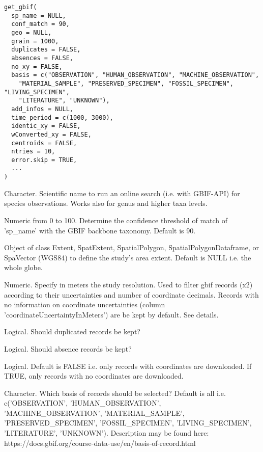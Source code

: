 \documentclass[a4paper]{book}
\begin{document}
%
\begin{Usage}
\begin{verbatim}
get_gbif(
  sp_name = NULL,
  conf_match = 90,
  geo = NULL,
  grain = 1000,
  duplicates = FALSE,
  absences = FALSE,
  no_xy = FALSE,
  basis = c("OBSERVATION", "HUMAN_OBSERVATION", "MACHINE_OBSERVATION",
    "MATERIAL_SAMPLE", "PRESERVED_SPECIMEN", "FOSSIL_SPECIMEN", "LIVING_SPECIMEN",
    "LITERATURE", "UNKNOWN"),
  add_infos = NULL,
  time_period = c(1000, 3000),
  identic_xy = FALSE,
  wConverted_xy = FALSE,
  centroids = FALSE,
  ntries = 10,
  error.skip = TRUE,
  ...
)
\end{verbatim}
\end{Usage}
%
\begin{Arguments}
\begin{ldescription}
\item[\code{sp\_name}] Character. Scientific name to run an online search
(i.e. with GBIF-API) for species observations. Works also for genus and higher taxa
levels.

\item[\code{conf\_match}] Numeric from 0 to 100. Determine the confidence threshold of match
of 'sp\_name' with the GBIF backbone taxonomy. Default is 90.

\item[\code{geo}] Object of class Extent, SpatExtent, SpatialPolygon, SpatialPolygonDataframe,
or SpaVector (WGS84) to define the study's area extent. Default is NULL i.e. the whole globe.

\item[\code{grain}] Numeric. Specify in meters the study resolution. Used to
filter gbif records (x2) according to their uncertainties and number of coordinate
decimals. Records with no information on coordinate uncertainties (column
'coordinateUncertaintyInMeters') are be kept by default. See details.

\item[\code{duplicates}] Logical. Should duplicated records be kept?

\item[\code{absences}] Logical. Should absence records be kept?

\item[\code{no\_xy}] Logical. Default is FALSE i.e. only records with coordinates are
downloaded. If TRUE, only records with no coordinates are downloaded.

\item[\code{basis}] Character. Which basis of records should be selected?
Default is all i.e. c('OBSERVATION', 'HUMAN\_OBSERVATION', 'MACHINE\_OBSERVATION',
'MATERIAL\_SAMPLE', 'PRESERVED\_SPECIMEN', 'FOSSIL\_SPECIMEN', 'LIVING\_SPECIMEN', 'LITERATURE',
'UNKNOWN'). Description may be found here: https://docs.gbif.org/course-data-use/en/basis-of-record.html


\end{ldescription}
\end{Arguments}
\end{document}
